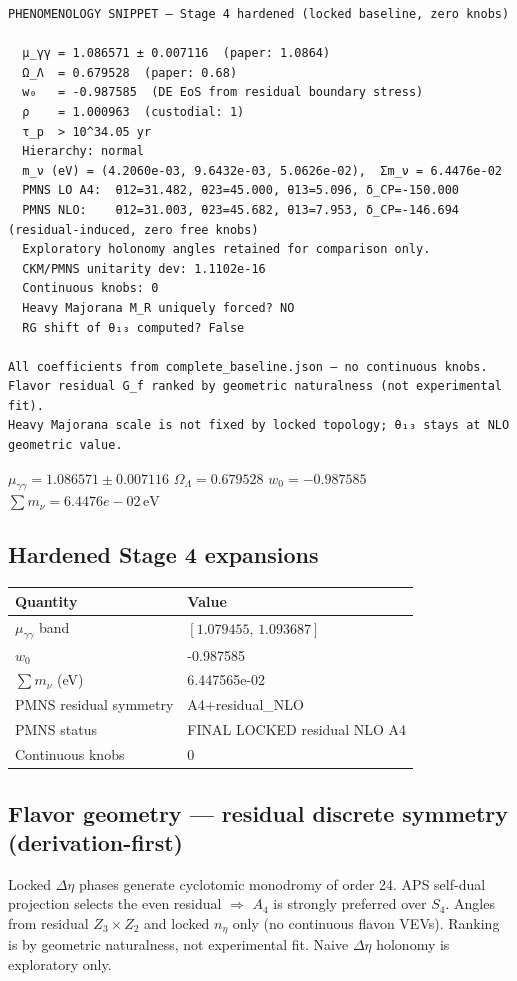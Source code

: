 \documentclass{article}
\begin{document}
\begin{verbatim}
PHENOMENOLOGY SNIPPET — Stage 4 hardened (locked baseline, zero knobs)

  μ_γγ = 1.086571 ± 0.007116  (paper: 1.0864)
  Ω_Λ  = 0.679528  (paper: 0.68)
  w₀   = -0.987585  (DE EoS from residual boundary stress)
  ρ    = 1.000963  (custodial: 1)
  τ_p  > 10^34.05 yr
  Hierarchy: normal
  m_ν (eV) = (4.2060e-03, 9.6432e-03, 5.0626e-02),  Σm_ν = 6.4476e-02
  PMNS LO A4:  θ12=31.482, θ23=45.000, θ13=5.096, δ_CP=-150.000
  PMNS NLO:    θ12=31.003, θ23=45.682, θ13=7.953, δ_CP=-146.694  (residual-induced, zero free knobs)
  Exploratory holonomy angles retained for comparison only.
  CKM/PMNS unitarity dev: 1.1102e-16
  Continuous knobs: 0
  Heavy Majorana M_R uniquely forced? NO
  RG shift of θ₁₃ computed? False

All coefficients from complete_baseline.json — no continuous knobs.
Flavor residual G_f ranked by geometric naturalness (not experimental fit).
Heavy Majorana scale is not fixed by locked topology; θ₁₃ stays at NLO geometric value.
\end{verbatim}
$\mu_{\gamma\gamma} = 1.086571\pm0.007116$ \quad
$\Omega_\Lambda = 0.679528$ \quad
$w_0 = -0.987585$ \quad
$\sum m_\nu = 6.4476e-02\,\mathrm{eV}$

\subsection{Hardened Stage 4 expansions}
\begin{center}
\begin{tabular}{ll}
\hline
Quantity & Value \\
\hline
$\mu_{\gamma\gamma}$ band &
  $[1.079455,\,
   1.093687]$ \\
$w_0$ & -0.987585 \\
$\sum m_\nu$ (eV) & 6.447565e-02 \\
PMNS residual symmetry & A4+residual_NLO \\
PMNS status & FINAL LOCKED residual NLO A4 \\
Continuous knobs & 0 \\
\hline
\end{tabular}
\end{center}

\subsection{Flavor geometry --- residual discrete symmetry (derivation-first)}
Locked $\Delta\eta$ phases generate cyclotomic monodromy of order 24.
APS self-dual projection selects the even residual $\Rightarrow$ $A_4$ is
strongly preferred over $S_4$. Angles from residual $Z_3\times Z_2$ and
locked $n_\eta$ only (no continuous flavon VEVs). Ranking is by geometric
naturalness, not experimental fit. Naive $\Delta\eta$ holonomy is exploratory only.
\end{document}
